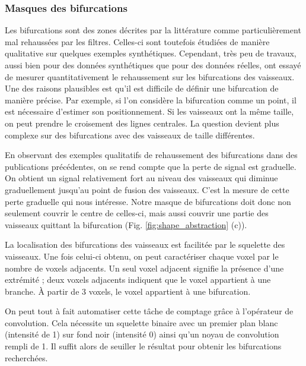 \subsubsection{Masques des bifurcations}
Les bifurcations sont des zones décrites par la littérature comme particulièrement mal rehaussées par les filtres. Celles-ci sont toutefois étudiées de manière qualitative sur quelques exemples synthétiques. Cependant, très peu de travaux, aussi bien pour des données synthétiques que pour des données réelles, ont essayé de mesurer quantitativement le rehaussement sur les bifurcations des vaisseaux. Une des raisons plausibles est qu'il est difficile de définir une bifurcation de manière précise. Par exemple, si l'on considère la bifurcation comme un point, il est nécessaire d'estimer son positionnement. Si les vaisseaux ont la même taille, on peut prendre le croisement des lignes centrales. La question devient plus complexe sur des bifurcations avec des vaisseaux de taille différentes.

En observant des exemples qualitatifs de rehaussement des bifurcations dans des publications précédentes, on se rend compte que la perte de signal est graduelle. On obtient un signal relativement fort au niveau des vaisseaux qui diminue graduellement jusqu'au point de fusion des vaisseaux. C'est la mesure de cette perte graduelle qui nous intéresse. Notre masque de bifurcations doit donc non seulement couvrir le centre de celles-ci, mais aussi couvrir une partie des vaisseaux quittant la bifurcation (Fig. \ref{fig:shape_abstraction} (c)).

La localisation des bifurcations des vaisseaux est facilitée par le squelette des vaisseaux. Une fois celui-ci obtenu, on peut caractériser chaque voxel par le nombre de voxels adjacents. Un seul voxel adjacent signifie la présence d'une extrémité ; deux voxels adjacents indiquent que le voxel appartient à une branche. À partir de 3 voxels, le voxel appartient à une bifurcation.

On peut tout à fait automatiser cette tâche de comptage grâce à l'opérateur de convolution. Cela nécessite un squelette binaire avec un premier plan blanc (intensité de 1) sur fond noir (intensité 0) ainsi qu'un noyau de convolution rempli de 1. Il suffit alors de seuiller le résultat pour obtenir les bifurcations recherchées.

